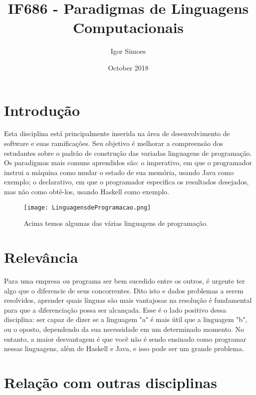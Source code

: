 \documentclass[10pt, a4paper]{article}
\title{IF686 - Paradigmas de Linguagens Computacionais}
\author{Igor Simoes}
\date{October 2018}
\begin{document}
\maketitle

\section{Introdução}
Esta disciplina está principalmente inserida na área de desenvolvimento de software e suas ramificações. Seu objetivo é melhorar a compreensão dos estudantes sobre o padrão de construção das variadas linguagens de programação.\cite{plpcin} Os paradigmas mais comuns aprendidos são: o imperativo, em que o programador instrui a máquina como mudar o estado de sua memória, usando Java como exemplo; o declarativo, em que o programador especifica os resultados desejados, mas não como obtê-los, usando Haskell como exemplo.\cite{plpubuk}\cite{plprt}
\begin{figure}[H]
\centering
\texttt{[image: LinguagensdeProgramacao.png]}
\caption{Acima temos algumas das várias linguagens de programação.}
\label{fig:linguagensdeprogramacao}
\end{figure}

\section{Relevância}
Para uma empresa ou programa ser bem sucedido entre os outros, é urgente ter algo que o diferencie de seus concorrentes. Dito isto e dados problemas a serem resolvidos, aprender quais línguas são mais vantajosas na resolução é fundamental para que a diferenciação possa ser alcançada.\cite{fcv} Esse é o lado positivo dessa disciplina: ser capaz de dizer se a linguagem "a" é mais útil que a linguagem "b", ou o oposto, dependendo da sua necessidade em um determinado momento. No entanto, a maior desvantagem é que você não é sendo ensinado como programar nessas linguagens, além de Haskell e Java, e isso pode ser um grande problema.

\section{Relação com outras disciplinas}
\end{document}
